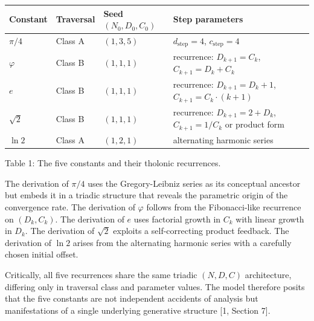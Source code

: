 \documentclass[12pt]{article}
\begin{document}
\begin{longtable}[]{@{}
  >{\raggedright\arraybackslash}p{}
  >{\raggedright\arraybackslash}p{}
  >{\raggedright\arraybackslash}p{}
  >{\raggedright\arraybackslash}p{}@{}}
\toprule\noalign{}
\begin{minipage}[b]{\linewidth}\raggedright
Constant
\end{minipage} & \begin{minipage}[b]{\linewidth}\raggedright
Traversal
\end{minipage} & \begin{minipage}[b]{\linewidth}\raggedright
Seed \((N_0, D_0, C_0)\)
\end{minipage} & \begin{minipage}[b]{\linewidth}\raggedright
Step parameters
\end{minipage} \\
\midrule\noalign{}
\endhead
\bottomrule\noalign{}
\endlastfoot
\(\pi/4\) & Class A & \((1, 3, 5)\) & \(d_\text{step}=4\),
\(c_\text{step}=4\) \\
\(\varphi\) & Class B & \((1, 1, 1)\) & recurrence: \(D_{k+1}=C_k\),
\(C_{k+1}=D_k+C_k\) \\
\(e\) & Class B & \((1, 1, 1)\) & recurrence: \(D_{k+1}=D_k+1\),
\(C_{k+1}=C_k \cdot (k+1)\) \\
\(\sqrt{2}\) & Class B & \((1, 1, 1)\) & recurrence: \(D_{k+1}=2+D_k\),
\(C_{k+1}=1/C_k\) or product form \\
\(\ln 2\) & Class A & \((1, 2, 1)\) & alternating harmonic series \\
\end{longtable}

Table 1: The five constants and their tholonic recurrences.

The derivation of \(\pi/4\) uses the Gregory-Leibniz series as its
conceptual ancestor but embeds it in a triadic structure that reveals
the parametric origin of the convergence rate. The derivation of
\(\varphi\) follows from the Fibonacci-like recurrence on
\((D_k, C_k)\). The derivation of \(e\) uses factorial growth in \(C_k\)
with linear growth in \(D_k\). The derivation of \(\sqrt{2}\) exploits a
self-correcting product feedback. The derivation of \(\ln 2\) arises
from the alternating harmonic series with a carefully chosen initial
offset.

Critically, all five recurrences share the same triadic \((N, D, C)\)
architecture, differing only in traversal class and parameter values.
The model therefore posits that the five constants are not independent
accidents of analysis but manifestations of a single underlying
generative structure {[}1, Section 7{]}.
\end{document}
